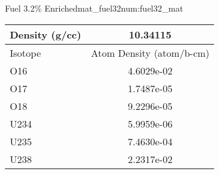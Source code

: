 \begin{matitem}{Fuel 3.2\% Enriched}{mat_fuel32}{num:fuel32_mat}
  \centering
  \begin{tabular}{l c}
    \toprule
    Density (g/cc) & 10.34115 \\
    \midrule
    Isotope & Atom Density (atom/b-cm) \\
    \midrule
    \midrule
O16 & 4.6029e-02 \\
O17 & 1.7487e-05 \\
O18 & 9.2296e-05 \\
U234 & 5.9959e-06 \\
U235 & 7.4630e-04 \\
U238 & 2.2317e-02 \\

    \bottomrule
  \end{tabular}
\end{matitem}
